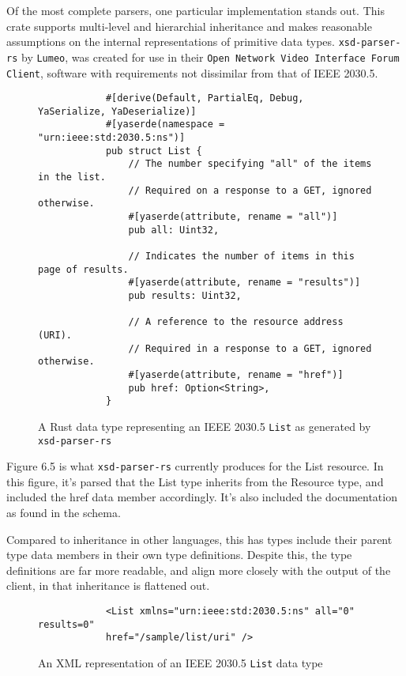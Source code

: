 Of the most complete parsers, one particular implementation stands out. This crate supports multi-level and hierarchial inheritance and makes reasonable assumptions on the internal representations of primitive data types.
\texttt{xsd-parser-rs} by \texttt{Lumeo}, was created for use in their \texttt{Open Network Video Interface Forum Client}, software with requirements not dissimilar from that of IEEE 2030.5. \cite[]{xsdparserrs}

\begin{figure}[H]
    \begin{center}
        \begin{lstlisting}
            #[derive(Default, PartialEq, Debug, YaSerialize, YaDeserialize)]
            #[yaserde(namespace = "urn:ieee:std:2030.5:ns")]
            pub struct List {
                // The number specifying "all" of the items in the list. 
                // Required on a response to a GET, ignored otherwise.
                #[yaserde(attribute, rename = "all")]
                pub all: Uint32,
            
                // Indicates the number of items in this page of results.
                #[yaserde(attribute, rename = "results")]
                pub results: Uint32,
            
                // A reference to the resource address (URI). 
                // Required in a response to a GET, ignored otherwise.
                #[yaserde(attribute, rename = "href")]
                pub href: Option<String>,
            }
        \end{lstlisting}
        \label{fig:listauto}
        \caption{A Rust data type representing an IEEE 2030.5 \texttt{List} as generated by \texttt{xsd-parser-rs}}
    \end{center}
\end{figure}

Figure 6.5 is what \texttt{xsd-parser-rs} currently produces for the List resource. In this figure, it's parsed that the List type inherits from the Resource type, and included the href data member accordingly. It's also included the documentation as found in the schema.

Compared to inheritance in other languages, this has types include their parent type data members in their own type definitions.
Despite this, the type definitions are far more readable, and align more closely with the output of the client, in that inheritance is flattened out.


\begin{figure}[H]
    \begin{center}
        \begin{lstlisting}
            <List xmlns="urn:ieee:std:2030.5:ns" all="0" results=0" 
            href="/sample/list/uri" />
        \end{lstlisting}
        \label{fig:listxml}
        \caption{An XML representation of an IEEE 2030.5 \texttt{List} data type}
    \end{center}
\end{figure}

